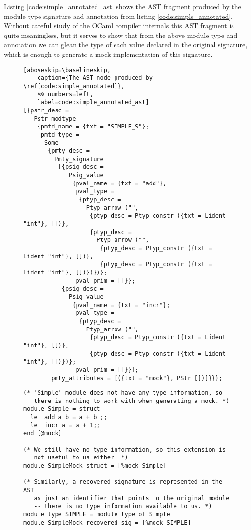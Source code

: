 Listing \ref{code:simple_annotated_ast} shows the AST fragment
produced by the module type signature and annotation from listing
\ref{code:simple_annotated}. Without careful study of the OCaml
compiler internals this AST fragment is quite meaningless, but it
serves to show that from the above module type and annotation we can
glean the type of each value declared in the original signature, which
is enough to generate a mock implementation of this signature.

\begin{figure}
\begin{lstlisting}[aboveskip=\baselineskip,
    caption={The AST node produced by \ref{code:simple_annotated}},
    %% numbers=left,
    label=code:simple_annotated_ast]
[{pstr_desc =
   Pstr_modtype
    {pmtd_name = {txt = "SIMPLE_S"};
     pmtd_type =
      Some
       {pmty_desc =
         Pmty_signature
          [{psig_desc =
             Psig_value
              {pval_name = {txt = "add"};
               pval_type =
                {ptyp_desc =
                  Ptyp_arrow ("",
                   {ptyp_desc = Ptyp_constr ({txt = Lident "int"}, [])},
                   {ptyp_desc =
                     Ptyp_arrow ("",
                      {ptyp_desc = Ptyp_constr ({txt = Lident "int"}, [])},
                      {ptyp_desc = Ptyp_constr ({txt = Lident "int"}, [])})})};
               pval_prim = []}};
           {psig_desc =
             Psig_value
              {pval_name = {txt = "incr"};
               pval_type =
                {ptyp_desc =
                  Ptyp_arrow ("",
                   {ptyp_desc = Ptyp_constr ({txt = Lident "int"}, [])},
                   {ptyp_desc = Ptyp_constr ({txt = Lident "int"}, [])})};
               pval_prim = []}}];
        pmty_attributes = [({txt = "mock"}, PStr [])]}}};
\end{lstlisting}
\end{figure}

\begin{figure}
\begin{lstlisting}[aboveskip=\baselineskip,
    caption={Elegant, but invalid, methods of specifying mock module},
    label=code:simple_annotated_bad]
(* 'Simple' module does not have any type information, so
   there is nothing to work with when generating a mock. *)
module Simple = struct
  let add a b = a + b ;;
  let incr a = a + 1;;
end [@mock]

(* We still have no type information, so this extension is
   not useful to us either. *)
module SimpleMock_struct = [%mock Simple]

(* Similarly, a recovered signature is represented in the AST
   as just an identifier that points to the original module
   -- there is no type information available to us. *)
module type SIMPLE = module type of Simple
module SimpleMock_recovered_sig = [%mock SIMPLE]
\end{lstlisting}
\end{figure}

